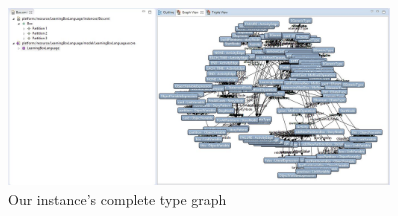 \begin{stepbystep}
\begin{figure}[htbp]
	\centering
  \includegraphics[width=0.9\textwidth]{../../org.moflon.doc.handbook.02_leitnersLearningBox/4_graphView/gvImages/eclipse_entireTypeGraph}
	\caption{Our instance's complete type graph}
	\label{eclipse:graphView_typeGraph}
\end{figure}


\end{stepbystep}
